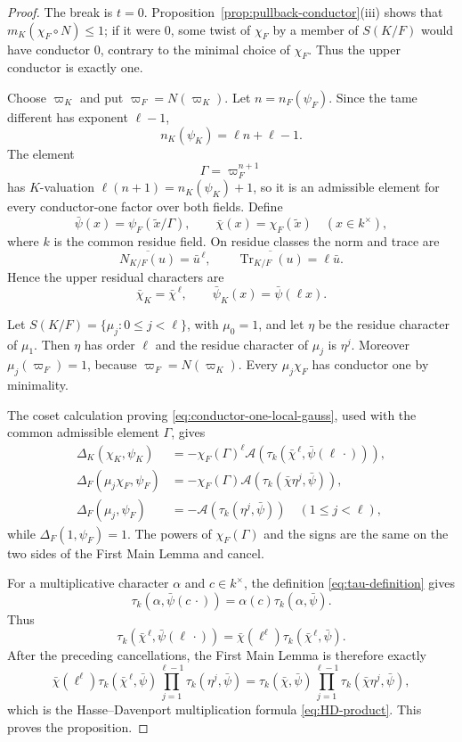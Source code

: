 \documentclass[11pt]{amsart}
\theoremstyle{definition}
\theoremstyle{remark}
\newcommand{\Tr}{\operatorname{Tr}}
\newcommand{\Aphase}{\mathcal A}
\begin{document}
\begin{proof}
The break is $t=0$.  Proposition~\ref{prop:pullback-conductor}(iii)
shows that $m_K(\chi_F\circ N)\le1$; if it were $0$, some twist of
$\chi_F$ by a member of $S(K/F)$ would have conductor $0$, contrary to
the minimal choice of $\chi_F$.  Thus the upper conductor is exactly
one.

Choose $\varpi_K$ and put $\varpi_F=N(\varpi_K)$.  Let
$n=n_F(\psi_F)$.  Since the tame different has exponent $\ell-1$,
\[
 n_K(\psi_K)=\ell n+\ell-1.
\]
The element
\[
 \Gamma=\varpi_F^{n+1}
\]
has $K$-valuation $\ell(n+1)=n_K(\psi_K)+1$, so it is an admissible
element for every conductor-one factor over both fields.  Define
\[
 \bar\psi(x)=\psi_F(\widetilde x/\Gamma),
 \qquad
 \bar\chi(x)=\chi_F(\widetilde x)
 \quad(x\in k^\times),
\]
where $k$ is the common residue field.  On residue classes the norm and
trace are
\[
 \overline{N_{K/F}(u)}=\bar u^{\,\ell},
 \qquad
 \overline{\Tr_{K/F}(u)}=\ell\bar u.
\]
Hence the upper residual characters are
\begin{equation}\label{eq:tame-one-upper-residual-characters}
 \bar\chi_K=\bar\chi^{\,\ell},
 \qquad
 \bar\psi_K(x)=\bar\psi(\ell x).
\end{equation}

Let $S(K/F)=\{\mu_j:0\le j<\ell\}$, with $\mu_0=1$, and let
$\eta$ be the residue character of $\mu_1$.  Then $\eta$ has order
$\ell$ and the residue character of $\mu_j$ is $\eta^j$.  Moreover
$\mu_j(\varpi_F)=1$, because $\varpi_F=N(\varpi_K)$.  Every
$\mu_j\chi_F$ has conductor one by minimality.

The coset calculation proving
\eqref{eq:conductor-one-local-gauss}, used with the common admissible
element $\Gamma$, gives
\begin{align*}
 \Delta_K(\chi_K,\psi_K)
 &=-\chi_F(\Gamma)^\ell
   \Aphase\!\left(\tau_k(\bar\chi^{\,\ell},
                              \bar\psi(\ell\,\cdot))\right),\\
 \Delta_F(\mu_j\chi_F,\psi_F)
 &=-\chi_F(\Gamma)
   \Aphase\!\left(\tau_k(\bar\chi\eta^j,\bar\psi)\right),\\
 \Delta_F(\mu_j,\psi_F)
 &=-\Aphase\!\left(\tau_k(\eta^j,\bar\psi)\right)
 \quad(1\le j<\ell),
\end{align*}
while $\Delta_F(1,\psi_F)=1$.  The powers of $\chi_F(\Gamma)$ and
the signs are the same on the two sides of the First Main Lemma and
cancel.

For a multiplicative character $\alpha$ and $c\in k^\times$, the
definition \eqref{eq:tau-definition} gives
\[
 \tau_k(\alpha,\bar\psi(c\,\cdot))
 =\alpha(c)\tau_k(\alpha,\bar\psi).
\]
Thus
\[
 \tau_k(\bar\chi^{\,\ell},\bar\psi(\ell\,\cdot))
 =\bar\chi(\ell^\ell)
   \tau_k(\bar\chi^{\,\ell},\bar\psi).
\]
After the preceding cancellations, the First Main Lemma is therefore
exactly
\[
 \bar\chi(\ell^\ell)
 \tau_k(\bar\chi^{\,\ell},\bar\psi)
 \prod_{j=1}^{\ell-1}\tau_k(\eta^j,\bar\psi)
 =
 \tau_k(\bar\chi,\bar\psi)
 \prod_{j=1}^{\ell-1}\tau_k(\bar\chi\eta^j,\bar\psi),
\]
which is the Hasse--Davenport multiplication formula
\eqref{eq:HD-product}.  This proves the proposition.
\end{proof}
\end{document}

